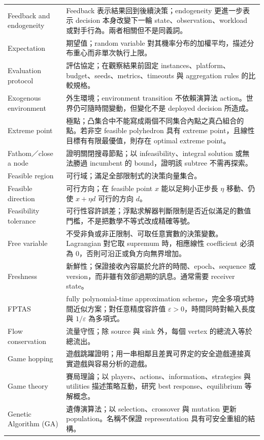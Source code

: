 \documentclass[11pt,a4paper,oneside,openany]{book}
\begin{document}
\begin{longtable}{@{}>{\raggedright\arraybackslash}p{}p{}@{}}
Feedback and endogeneity & Feedback 表示結果回到後續決策；endogeneity 更進一步表示 decision 本身改變下一輪 state、observation、workload 或對手行為。兩者相關但不是同義詞。 \\
Expectation & 期望值；random variable 對其機率分布的加權平均，描述分布重心而非單次執行上限。 \\
Evaluation protocol & 評估協定；在觀察結果前固定 instances、platform、budget、seeds、metrics、timeouts 與 aggregation rules 的比較規格。 \\
Exogenous environment & 外生環境；environment transition 不依賴演算法 action。世界仍可隨時間變動，但變化不是 deployed decision 所造成。 \\
Extreme point & 極點；凸集合中不能寫成兩個不同集合內點之真凸組合的點。若非空 feasible polyhedron 具有 extreme point，且線性目標有有限最優值，則存在 optimal extreme point。 \\
Fathom／close a node & 證明關閉搜尋節點；以 infeasibility、integral solution 或無法勝過 incumbent 的 bound，證明該 subtree 不需再探索。 \\
Feasible region & 可行域；滿足全部限制式的決策向量集合。 \\
Feasible direction & 可行方向；在 feasible point $x$ 能以足夠小正步長 $\eta$ 移動、仍使 $x+\eta d$ 可行的方向 $d$。 \\
Feasibility tolerance & 可行性容許誤差；浮點求解器判斷限制是否近似滿足的數值門檻，不是把數學不等式改成精確等號。 \\
Free variable & 不受非負或非正限制、可取任意實數的決策變數。Lagrangian 對它取 supremum 時，相應線性 coefficient 必須為 0，否則可沿正或負方向無界增加。 \\
Freshness & 新鮮性；保證接收內容屬於允許的時間、epoch、sequence 或 version，而非雖有效卻過期的訊息。通常需要 receiver state。 \\
FPTAS & fully polynomial-time approximation scheme，完全多項式時間近似方案；對任意精度容許值 $\varepsilon>0$，時間同時對輸入長度與 $1/\varepsilon$ 為多項式。 \\
Flow conservation & 流量守恆；除 source 與 sink 外，每個 vertex 的總流入等於總流出。 \\
Game hopping & 遊戲跳躍證明；用一串相鄰且差異可界定的安全遊戲連接真實遊戲與容易分析的遊戲。 \\
Game theory & 賽局理論；以 players、actions、information、strategies 與 utilities 描述策略互動，研究 best response、equilibrium 等解概念。 \\
Genetic Algorithm (GA) & 遺傳演算法；以 selection、crossover 與 mutation 更新 population。名稱不保證 representation 具有可安全重組的結構。 \\

\end{longtable}
\end{document}
